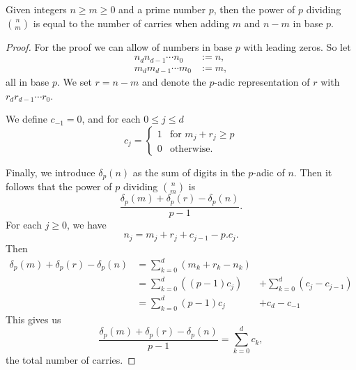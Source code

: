 \documentclass[12pt]{article}
\begin{document}
Given integers $n \ge m \ge 0$ and a prime number $p$, then the power of $p$
dividing $\binom{n}{m}$ is equal to the number of carries when adding $m$ and
$n -m$ in base $p$.
\begin{proof}
For the proof we can allow  of numbers in base $p$ with leading
zeros. So let
\begin{eqnarray*}
n_dn_{d-1}\cdots n_0 & := n, \\
m_dm_{d-1}\cdots m_0 & := m,
\end{eqnarray*}
all in base $p$. We set $r=n-m$ and denote the $p$-adic representation of $r$
with $r_dr_{d-1}\cdots r_0$.

We define $c_{-1} =0$, and for each $0 \le j \le d$
\begin{equation}
c_j =\begin{cases}
1 & \text{for $m_j +r_j \ge p$} \\
0 &\text{otherwise.}
\end{cases}
\end{equation}

Finally, we introduce $\delta_p(n)$ as the sum of digits in the $p$-adic
 of $n$. Then it follows that the power of $p$ dividing $\binom{n}{m}$ is
\[\frac{\delta_p(m) +\delta_p(r) -\delta_p(n)}{p-1}.\]
For each $j \ge 0$, we have
\[n_j =m_j +r_j +c_{j-1} -p.c_j.\]
Then
\begin{eqnarray*}
\delta_p(m) +\delta_p(r) -\delta_p(n) &=\sum_{k=0}^d \left(m_k +r_k -n_k\right)
\\
&=\sum_{k=0}^d \left((p-1)c_j\right)
&+\sum_{k=0}^d \left(c_j
-c_{j-1}\right) \\
&=\sum_{k=0}^d (p-1)c_j&+c_d -c_{-1}
\end{eqnarray*}
This gives us
\[\frac{\delta_p(m) +\delta_p(r) -\delta_p(n)}{p-1} =\sum_{k=0}^d c_k,\]
the total number of carries.
\end{proof}
\end{document}
